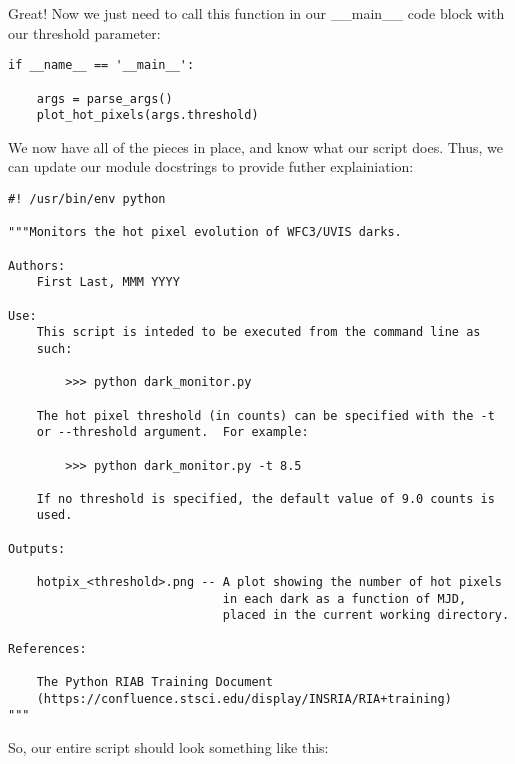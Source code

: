 Great! Now we just need to call this function in our {\sf\small \_\_main\_\_} code block with
our threshold parameter:

\begin{verbatim}
if __name__ == '__main__':

    args = parse_args()
    plot_hot_pixels(args.threshold)

\end{verbatim}

We now have all of the pieces in place, and know what our script does.  Thus, we can
update our module docstrings to provide futher explainiation:

\begin{verbatim}
#! /usr/bin/env python

"""Monitors the hot pixel evolution of WFC3/UVIS darks.

Authors:
    First Last, MMM YYYY

Use:
    This script is inteded to be executed from the command line as
    such:

        >>> python dark_monitor.py

    The hot pixel threshold (in counts) can be specified with the -t 
    or --threshold argument.  For example:

        >>> python dark_monitor.py -t 8.5

    If no threshold is specified, the default value of 9.0 counts is 
    used.

Outputs:

    hotpix_<threshold>.png -- A plot showing the number of hot pixels 
                              in each dark as a function of MJD, 
                              placed in the current working directory.

References:

    The Python RIAB Training Document
    (https://confluence.stsci.edu/display/INSRIA/RIA+training)
"""
\end{verbatim}

So, our entire script should look something like this:


